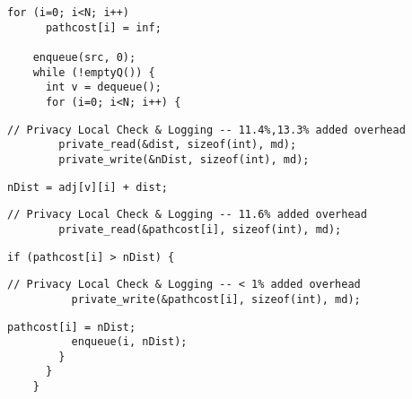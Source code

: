   \begin{lstlisting}[morekeywords={pathcost},aboveskip=0pt, belowskip=0pt, firstnumber=auto,name=dij_checks]
    for (i=0; i<N; i++)
      pathcost[i] = inf;

    enqueue(src, 0);
    while (!emptyQ()) {
      int v = dequeue();
      for (i=0; i<N; i++) {
  \end{lstlisting}

  \begin{lstlisting}[morekeywords={pathcost,dist,nDist}, aboveskip=0pt,belowskip=0pt,backgroundcolor=\color{lightgray},
  firstnumber=auto, name=dij_checks]
        // Privacy Local Check & Logging -- 11.4%,13.3% added overhead
        private_read(&dist, sizeof(int), md);
        private_write(&nDist, sizeof(int), md);
  \end{lstlisting}

  \begin{lstlisting}[morekeywords={pathcost,dist,nDist}, aboveskip=0pt, belowskip=0pt, firstnumber=auto,name=dij_checks]
        nDist = adj[v][i] + dist;
  \end{lstlisting}

  \begin{lstlisting}[morekeywords={pathcost}, aboveskip=0pt,belowskip=0pt,backgroundcolor=\color{lightgray},
  firstnumber=auto, name=dij_checks]
        // Privacy Local Check & Logging -- 11.6% added overhead
        private_read(&pathcost[i], sizeof(int), md);
  \end{lstlisting}


  \begin{lstlisting}[morekeywords={pathcost}, aboveskip=0pt, belowskip=0pt, firstnumber=auto,name=dij_checks]
        if (pathcost[i] > nDist) {
  \end{lstlisting}

  \begin{lstlisting}[morekeywords={pathcost}, aboveskip=0pt,belowskip=0pt,backgroundcolor=\color{lightgray},
  firstnumber=auto, name=dij_checks]
          // Privacy Local Check & Logging -- < 1% added overhead
          private_write(&pathcost[i], sizeof(int), md);
  \end{lstlisting}

  \begin{lstlisting}[morekeywords={pathcost}, aboveskip=0pt, belowskip=0pt, firstnumber=auto,name=dij_checks]
          pathcost[i] = nDist;
          enqueue(i, nDist);
        }
      }
    }
    \end{lstlisting}

